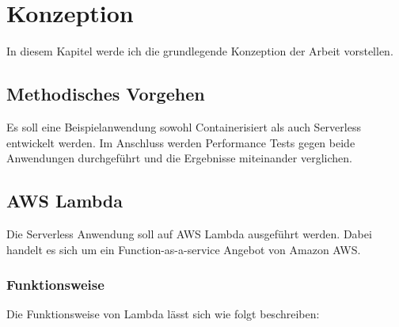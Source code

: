 \chapter{Konzeption}
In diesem Kapitel werde ich die grundlegende Konzeption der Arbeit vorstellen.

\section{Methodisches Vorgehen}
Es soll eine Beispielanwendung sowohl Containerisiert als auch Serverless entwickelt werden. Im Anschluss werden Performance Tests gegen beide Anwendungen durchgeführt und die Ergebnisse miteinander verglichen.

\section{AWS Lambda}
Die Serverless Anwendung soll auf AWS Lambda ausgeführt werden. Dabei handelt es sich um ein Function-as-a-service Angebot von Amazon AWS.

\subsection{Funktionsweise}
Die Funktionsweise von Lambda lässt sich wie folgt beschreiben\cite{amazon_aws_aws_2020}:

